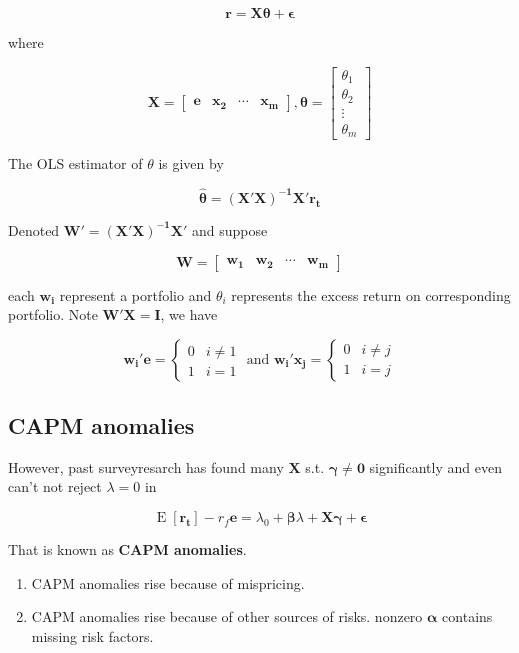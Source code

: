 \documentclass{article}
\begin{document}
\[ \bm{\mathbf{r=X\theta+\epsilon}} \]

where

\[ \bm{\mathbf{X}}=\begin{bmatrix}
  \bm{\mathbf{e}}&\bm{\mathbf{x_2}}&\cdots&\bm{\mathbf{x_m}}
\end{bmatrix},\bm{\mathbf{\theta}}=\begin{bmatrix}
  \theta_1\\\theta_2\\\vdots \\ \theta_m
\end{bmatrix} \]

The OLS estimator of \(\theta\) is given by

\[ \bm{\mathbf{\hat{\theta}}}=\bm{\mathbf{(X'X)^{-1}X'r_t}} \]

Denoted \(\bm{\mathbf{W'=(X'X)^{-1}X'}}\) and suppose

\[ \bm{\mathbf{W}}=\begin{bmatrix}
  \bm{\mathbf{w_1}}&
  \bm{\mathbf{w_2}}&
  \cdots&
  \bm{\mathbf{w_m}}
\end{bmatrix} \]

each \(\bm{\mathbf{w_i}}\) represent a portfolio and \(\theta_i\)
represents the excess return on corresponding portfolio. Note
\(\bm{\mathbf{W'X=I}}\), we have

\[\bm{\mathbf{w_i'e}}= \begin{cases}
  0&i\neq1\\
  1&i=1
\end{cases} \text{ and } \bm{\mathbf{w_i'x_j}}=\begin{cases}
  0&i\neq j\\
  1&i=j
\end{cases} \]

\hypertarget{capm-anomalies}{%
\subsection{CAPM anomalies}\label{capm-anomalies}}

However, past surveyresarch has found many \(\bm{\mathbf{X}}\) s.t.
\(\bm{\mathbf{\gamma\neq 0}}\) significantly and even can't not reject
\(\lambda=0\) in

\[ \mathop{\text{E}}[\bm{\mathbf{r_t}}]-r_f \bm{\mathbf{e}}=\lambda_0+\bm{\mathbf{\beta}}\lambda+\bm{\mathbf{X\gamma}}+\bm{\mathbf{\epsilon}}  \]

That is known as \textbf{CAPM anomalies}.

\begin{enumerate}
\def\labelenumi{\arabic{enumi}.}
\item
  CAPM anomalies rise because of mispricing.
\item
  CAPM anomalies rise because of other sources of risks. nonzero
  \(\bm{\mathbf{\alpha}}\) contains missing risk factors.
\end{enumerate}
\end{document}

